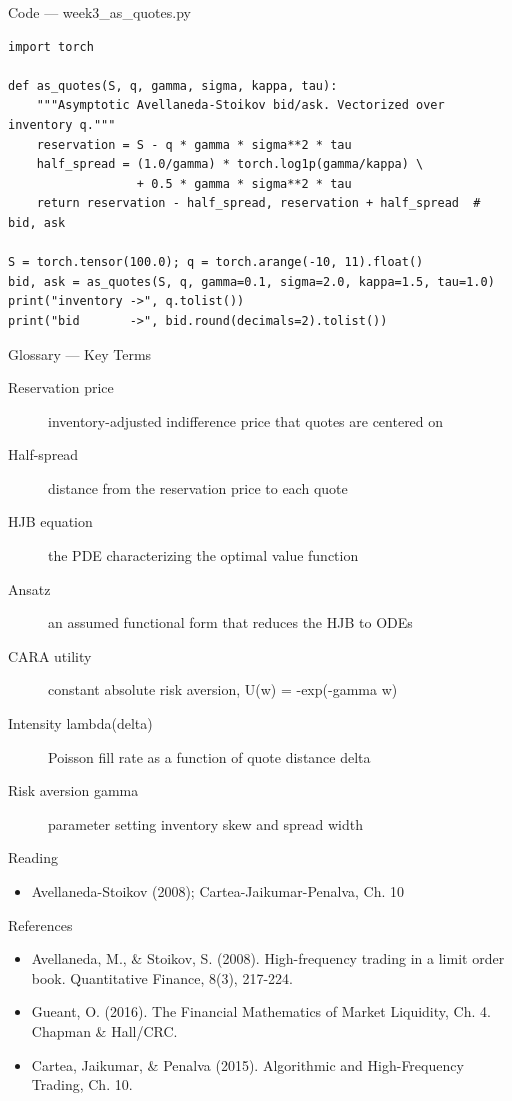 \documentclass[aspectratio=169,10pt]{beamer}
\begin{document}
\begin{frame}[fragile]{Code --- week3\_as\_quotes.py}
\begin{lstlisting}
import torch

def as_quotes(S, q, gamma, sigma, kappa, tau):
    """Asymptotic Avellaneda-Stoikov bid/ask. Vectorized over inventory q."""
    reservation = S - q * gamma * sigma**2 * tau
    half_spread = (1.0/gamma) * torch.log1p(gamma/kappa) \
                  + 0.5 * gamma * sigma**2 * tau
    return reservation - half_spread, reservation + half_spread  # bid, ask

S = torch.tensor(100.0); q = torch.arange(-10, 11).float()
bid, ask = as_quotes(S, q, gamma=0.1, sigma=2.0, kappa=1.5, tau=1.0)
print("inventory ->", q.tolist())
print("bid       ->", bid.round(decimals=2).tolist())
\end{lstlisting}
\end{frame}
\begin{frame}{Glossary --- Key Terms}
\footnotesize\begin{description}
\item[\color{ncsured}Reservation price] inventory-adjusted indifference price that quotes are centered on
\item[\color{ncsured}Half-spread] distance from the reservation price to each quote
\item[\color{ncsured}HJB equation] the PDE characterizing the optimal value function
\item[\color{ncsured}Ansatz] an assumed functional form that reduces the HJB to ODEs
\item[\color{ncsured}CARA utility] constant absolute risk aversion, U(w) = -exp(-gamma w)
\item[\color{ncsured}Intensity lambda(delta)] Poisson fill rate as a function of quote distance delta
\item[\color{ncsured}Risk aversion gamma] parameter setting inventory skew and spread width
\end{description}
\end{frame}

\begin{frame}{Reading}
\begin{itemize}
  \item Avellaneda-Stoikov (2008); Cartea-Jaikumar-Penalva, Ch. 10
\end{itemize}
\end{frame}

\begin{frame}{References}
\scriptsize\begin{itemize}\setlength{\itemsep}{3pt}
  \item Avellaneda, M., \& Stoikov, S. (2008). High-frequency trading in a limit order book. Quantitative Finance, 8(3), 217-224.
  \item Gueant, O. (2016). The Financial Mathematics of Market Liquidity, Ch. 4. Chapman \& Hall/CRC.
  \item Cartea, Jaikumar, \& Penalva (2015). Algorithmic and High-Frequency Trading, Ch. 10.
\end{itemize}
\end{frame}
\end{document}
